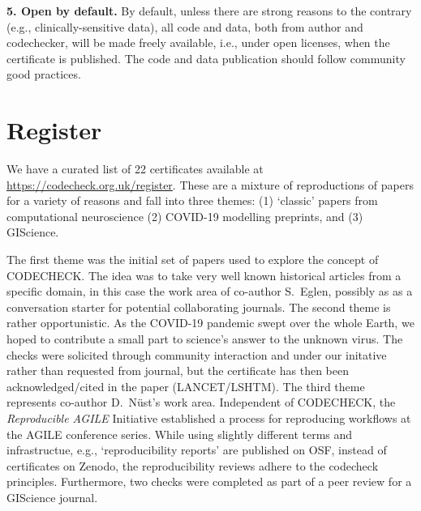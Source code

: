 \documentclass[12pt]{article}
\begin{document}
\textbf{5. Open by default.}  By default, unless there are strong
reasons to the contrary (e.g., clinically-sensitive data), all code and
data, both from author and codechecker, will be made freely available, i.e., 
under open licenses, when the certificate is published. The code and data 
publication should follow community good practices.

\section*{Register}\label{register}

We have a curated list of 22 certificates available at
\url{https://codecheck.org.uk/register}. These are a mixture of
reproductions of papers for a variety of reasons and fall into three themes:
(1) `classic' papers from computational neuroscience
(2) COVID-19 modelling preprints, and
(3) GIScience.  

The first theme was the initial set of papers used to explore the concept
of CODECHECK. The idea was to take very well known historical articles from a 
specific domain, in this case the work area of co-author S.~Eglen, possibly 
as as a conversation starter for potential collaborating journals.
The second theme is rather opportunistic. As the COVID-19 pandemic swept
over the whole Earth, we hoped to contribute a small part to science's answer
to the unknown virus. The checks were solicited through community interaction
and under our initative rather than requested from journal, but the certificate
has then been acknowledged/cited in the paper (LANCET/LSHTM). %
The third theme represents co-author D.~N\"ust's work area.
Independent of CODECHECK, the \emph{Reproducible AGILE} Initiative \cite{reproducible_agile}
established a process for reproducing workflows at the AGILE conference
series. %
While using slightly different terms and infrastructue, e.g., `reproducibility
reports' are published on OSF, instead of certificates on Zenodo, the 
reproducibility reviews adhere to the codecheck principles.
Furthermore, two checks were completed as part of a peer review for a
GIScience journal.
\end{document}
